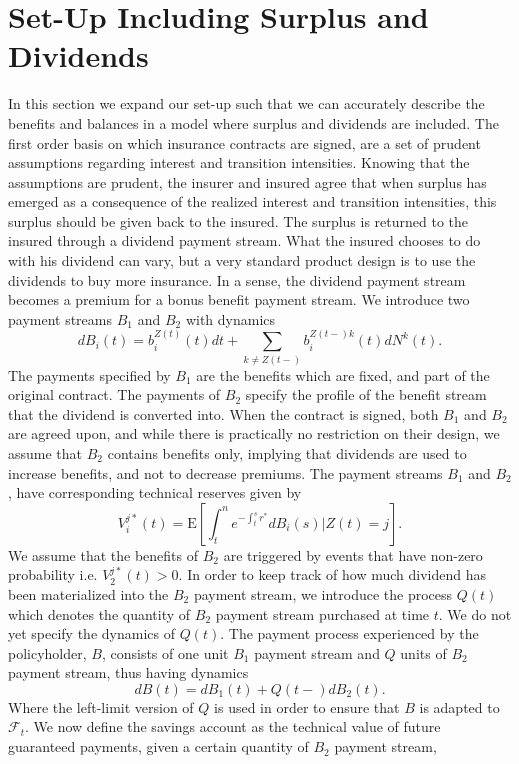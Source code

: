 \documentclass[12pt]{article}
\newcommand{\E}{\text{E}}
\theoremstyle{my_thm}
\begin{document}
\section{Set-Up Including Surplus and Dividends} \label{sec:Set_2}
In this section we expand our set-up such that we can accurately describe the benefits and balances in a model where surplus and dividends are included. The first order basis on which insurance contracts are signed, are a set of prudent assumptions regarding interest and transition intensities. Knowing that the assumptions are prudent, the insurer and insured agree that when surplus has emerged as a consequence of the realized interest and transition intensities, this surplus should be given back to the insured. The surplus is returned to the insured through a dividend payment stream. What the insured chooses to do with his dividend can vary, but a very standard product design is to use the dividends to buy more insurance. In a sense, the dividend payment stream becomes a premium for a bonus benefit payment stream. We introduce two payment streams $B_1$ and $B_2$ with dynamics
$$
dB_i(t)=b_i^{Z(t)}(t) dt +\sum_{k \neq Z(t-)} b_i^{Z(t-)k}(t)dN^k(t).
$$
The payments specified by $B_1$ are the benefits which are fixed, and part of the original contract. The payments of $B_2$ specify the profile of the benefit stream that the dividend is converted into. When the contract is signed, both $B_1$ and $B_2$ are agreed upon, and while there is practically no restriction on their design, we assume that $B_2$ contains benefits only, implying that dividends are used to increase benefits, and not to decrease premiums. The payment streams $B_1$ and $B_2$, have corresponding technical reserves given by
$$
V_i^{j*}(t)=\E \left[ \int_t^n e^{-\int_t^s r^*} dB_i(s) \big| Z(t)=j \right].
$$
We assume that the benefits of $B_2$ are triggered by events that have non-zero probability i.e. $V_2^{j*}(t)>0$. In order to keep track of how much dividend has been materialized into the $B_2$ payment stream, we introduce the process $Q(t)$ which denotes the quantity of $B_2$ payment stream purchased at time $t$. We do not yet specify the dynamics of $Q(t)$. The payment process experienced by the policyholder, $B$, consists of one unit $B_1$ payment stream and $Q$ units of $B_2$ payment stream, thus having dynamics
$$
dB(t)=dB_1(t)+ Q(t-)dB_2(t).
$$
Where the left-limit version of $Q$ is used in order to ensure that $B$ is adapted to $\mathcal{F}_t$. We now define the savings account as the technical value of future guaranteed payments, given a certain quantity of $B_2$ payment stream,
\end{document}
